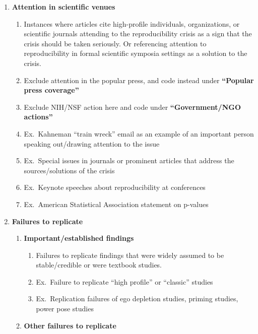 \documentclass[
]{scrartcl}
\begin{document}
\begin{enumerate}
\def\labelenumi{\arabic{enumi}.}
\item
  \textbf{Attention in scientific venues}

  \begin{enumerate}

  \item
    Instances where articles cite high-profile individuals,
    organizations, or scientific journals attending to the
    reproducibility crisis as a sign that the crisis should be taken
    seriously. Or referencing attention to reproducibility in formal
    scientific symposia settings as a solution to the crisis.
  \item
    Exclude attention in the popular press, and code instead under
    \textbf{``Popular press coverage''}
  \item
    Exclude NIH/NSF action here and code under \textbf{``Government/NGO
    actions''}
  \item
    Ex.~Kahneman ``train wreck'' email as an example of an important
    person speaking out/drawing attention to the issue
  \item
    Ex.~Special issues in journals or prominent articles that address
    the sources/solutions of the crisis
  \item
    Ex.~Keynote speeches about reproducibility at conferences
  \item
    Ex.~American Statistical Association statement on p-values
  \end{enumerate}
\item
  \textbf{Failures to replicate}

  \begin{enumerate}

  \item
    \textbf{Important/established findings}

    \begin{enumerate}
    
    \item
      Failures to replicate findings that were widely assumed to be
      stable/credible or were textbook studies.
    \item
      Ex.~Failure to replicate ``high profile'' or ``classic'' studies
    \item
      Ex.~Replication failures of ego depletion studies, priming
      studies, power pose studies
    \end{enumerate}
  \item
    \textbf{Other failures to replicate}


\end{enumerate}
\end{enumerate}
\end{document}
